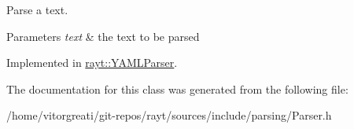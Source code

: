 Parse a text. 


\begin{DoxyParams}{Parameters}
{\em text} & the text to be parsed \\
\hline
\end{DoxyParams}


Implemented in \mbox{\hyperlink{classrayt_1_1_y_a_m_l_parser_a646b059fb458cbd5b9bc3a29c1f777f4}{rayt\+::\+Y\+A\+M\+L\+Parser}}.



The documentation for this class was generated from the following file\+:\begin{DoxyCompactItemize}
\item 
/home/vitorgreati/git-\/repos/rayt/sources/include/parsing/Parser.\+h\end{DoxyCompactItemize}
